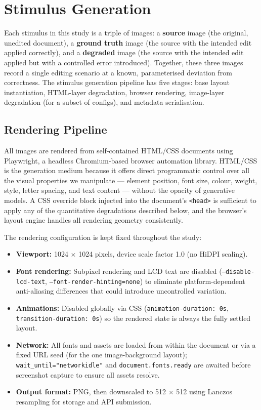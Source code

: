 \section{Stimulus Generation} \label{Stimulus Generation}

Each stimulus in this study is a triple of images: a \textbf{source} image (the original, unedited document), a \textbf{ground truth} image (the source with the intended edit applied correctly), and a \textbf{degraded} image (the source with the intended edit applied but with a controlled error introduced). Together, these three images record a single editing scenario at a known, parameterised deviation from correctness. The stimulus generation pipeline has five stages: base layout instantiation, HTML-layer degradation, browser rendering, image-layer degradation (for a subset of configs), and metadata serialisation.

\subsection{Rendering Pipeline} \label{Rendering Pipeline}

All images are rendered from self-contained HTML/CSS documents using Playwright, a headless Chromium-based browser automation library. HTML/CSS is the generation medium because it offers direct programmatic control over all the visual properties we manipulate --- element position, font size, colour, weight, style, letter spacing, and text content --- without the opacity of generative models. A CSS override block injected into the document's \texttt{<head>} is sufficient to apply any of the quantitative degradations described below, and the browser's layout engine handles all rendering geometry consistently.

The rendering configuration is kept fixed throughout the study:

\begin{itemize}
    \item \textbf{Viewport:} 1024 $\times$ 1024 pixels, device scale factor 1.0 (no HiDPI scaling).
    \item \textbf{Font rendering:} Subpixel rendering and LCD text are disabled (\texttt{--disable-lcd-text}, \texttt{--font-render-hinting=none}) to eliminate platform-dependent anti-aliasing differences that could introduce uncontrolled variation.
    \item \textbf{Animations:} Disabled globally via CSS (\texttt{animation-duration: 0s}, \texttt{transition-duration: 0s}) so the rendered state is always the fully settled layout.
    \item \textbf{Network:} All fonts and assets are loaded from within the document or via a fixed URL seed (for the one image-background layout); \texttt{wait\_until="networkidle"} and \texttt{document.fonts.ready} are awaited before screenshot capture to ensure all assets resolve.
    \item \textbf{Output format:} PNG, then downscaled to 512 $\times$ 512 using Lanczos resampling for storage and API submission.
\end{itemize}

